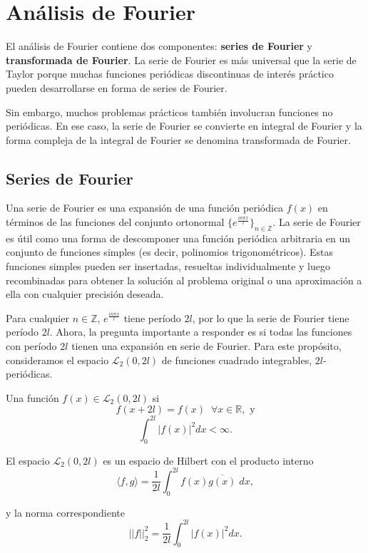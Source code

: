 \begin{multicols}{2}
\begin{enumerate}[\bfseries (i)]
\end{enumerate}





\chapter{Análisis de Fourier}
El análisis de Fourier contiene dos componentes: \textbf{series de Fourier} y \textbf{transformada de Fourier}. La serie de Fourier es más universal que la serie de Taylor porque muchas funciones periódicas discontinuas de interés práctico pueden desarrollarse en forma de series de Fourier.

Sin embargo, muchos problemas prácticos también involucran funciones no periódicas. En ese caso, la serie de Fourier se convierte en integral de Fourier y la forma compleja de la integral de Fourier se denomina transformada de Fourier.

\section{Series de Fourier}
Una serie de Fourier es una expansión de una función periódica $f(x)$ en términos de las funciones del conjunto ortonormal $\{e^{\frac{in\pi x}{l}}\}_{n\in\mathbb{Z}}$. La serie de Fourier es útil como una forma de descomponer una función periódica arbitraria en un conjunto de funciones simples (es decir, polinomios trigonométricos). Estas funciones simples pueden ser insertadas, resueltas individualmente y luego recombinadas para obtener la solución al problema original o una aproximación a ella con cualquier precisión deseada.

Para cualquier $n \in \mathbb{Z}$, $e^{\frac{in\pi x}{l}}$ tiene período $2l$, por lo que la serie de Fourier tiene período $2l$. Ahora, la pregunta importante a responder es si todas las funciones con período $2l$ tienen una expansión en serie de Fourier. Para este propósito, consideramos el espacio $\mathcal{L}_2(0, 2l)$ de funciones cuadrado integrables, $2l$-periódicas.

Una función $f(x) \in \mathcal{L}_2(0, 2l)$ si 
$$f(x + 2l) = f(x)\;\; \forall x \in \mathbb{R}, \text{ y}$$
$$\displaystyle\int_0^{2l} |f(x)|^2 dx < \infty.$$

El espacio $\mathcal{L}_2(0, 2l)$ es un espacio de Hilbert con el producto interno
$$\langle f, g \rangle = \frac{1}{2l} \int_0^{2l} f(x)\overline{g(x)}\;dx,$$

y la norma correspondiente
$$||f||_2^2 = \frac{1}{2l} \int_0^{2l} |f(x)|^2 dx.$$


\end{multicols}
